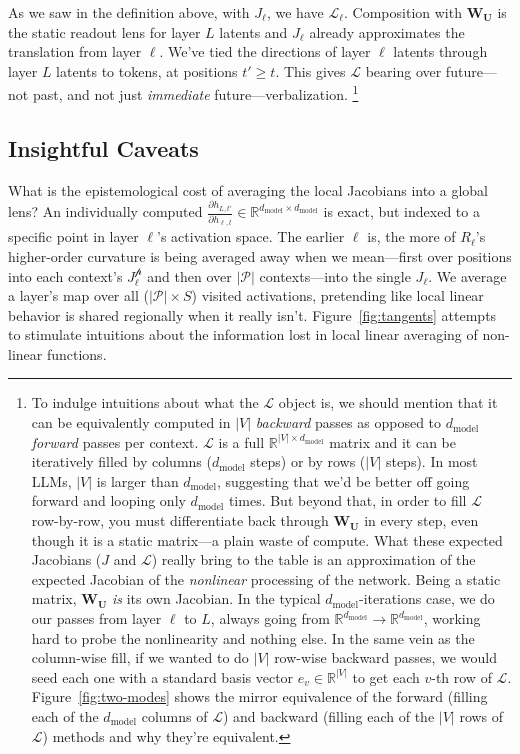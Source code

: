 \documentclass{article}
\newcommand{\jlens}{\mathscr{L}}
\newcommand{\dmodel}{d_{\text{model}}}
\begin{document}
As we saw in the definition above, with \(J_\ell\), we have \(\jlens_\ell\). Composition with \(\mathbf{W_U}\) is the static readout lens for layer \(L\) latents and \(J_\ell\) already approximates the translation from layer \(\ell\). We've tied the directions of layer \(\ell\) latents through layer \(L\) latents to tokens, at positions \(t' \ge t\). This gives \(\jlens\) bearing over future---not past, and not just \textit{immediate} future---verbalization. \footnote{To indulge intuitions about what the \(\jlens\) object is, we should mention that it can be equivalently computed in \(|V|\) \textit{backward} passes as opposed to \(\dmodel\) \textit{forward} passes per context. \(\jlens\) is a full \(\mathbb{R}^{|V| \times \dmodel}\) matrix and it can be iteratively filled by columns (\(\dmodel\) steps) or by rows (\(|V|\) steps). In most LLMs, \(|V|\) is larger than \(\dmodel\), suggesting that we'd be better off going forward and looping only \(\dmodel\) times. But beyond that, in order to fill \(\jlens\) row-by-row, you must differentiate back through \(\mathbf{W_U}\) in every step, even though it is a static matrix---a plain waste of compute. What these expected Jacobians (\(J\) and \(\jlens\)) really bring to the table is an approximation of the expected Jacobian of the \textit{nonlinear} processing of the network. Being a static matrix, \(\mathbf{W_U}\) \textit{is} its own Jacobian. In the typical \(\dmodel\)-iterations case, we do our passes from layer \(\ell\) to \(L\), always going from \(\mathbb{R}^{\dmodel} \to \mathbb{R}^{\dmodel}\), working hard to probe the nonlinearity and nothing else. In the same vein as the column-wise fill, if we wanted to do \(|V|\) row-wise backward passes, we would seed each one with a standard basis vector \(e_v \in \mathbb{R}^{|V|}\) to get each \(v\)-th row of \(\jlens\). Figure~\ref{fig:two-modes} shows the mirror equivalence of the forward (filling each of the \(\dmodel\) columns of \(\jlens\)) and backward (filling each of the \(|V|\) rows of \(\jlens\)) methods and why they're equivalent. } 




\subsection{Insightful Caveats}
What is the epistemological cost of averaging the local Jacobians into a global lens? An individually computed \(\frac{\partial h_{L,t'}}{\partial h_{\ell,t}} \in \mathbb{R}^{\dmodel \times \dmodel}\) is exact, but indexed to a specific point in layer \(\ell\)'s activation space. The earlier \(\ell\) is, the more of \(R_{\ell}\)'s higher-order curvature is being averaged away when we mean---first over positions into each context's \(J^{\mathscr{p}}_{\ell}\) and then over \(|\mathscr{P}|\) contexts---into the single \(J_{\ell}\). We average a layer's map over all (\(|\mathscr{P}| \times S\)) visited activations, pretending like local linear behavior is shared regionally when it really isn't. Figure~\ref{fig:tangents} attempts to stimulate intuitions about the information lost in local linear averaging of non-linear functions.
\end{document}
